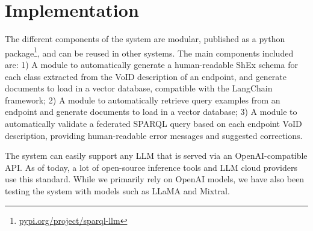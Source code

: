 \documentclass[
]{ceurart}
\begin{document}
\section{Implementation}

The different components of the system are modular, published as a python package\footnote{\href{https://pypi.org/project/sparql-llm}{pypi.org/project/sparql-llm}}, and can be reused in other systems. The main components included are: 1) A module to automatically generate a human-readable ShEx schema for each class extracted from the VoID description of an endpoint, and generate documents to load in a vector database, compatible with the LangChain framework; 2) A module to automatically retrieve query examples from an endpoint and generate documents to load in a vector database; 3) A module to automatically validate a federated SPARQL query based on each endpoint VoID description, providing human-readable error messages and suggested corrections.



The system can easily support any LLM that is served via an OpenAI-compatible API. As of today, a lot of open-source inference tools and LLM cloud providers use this standard. While we primarily rely on OpenAI models, we have also been testing the system with models such as LLaMA and Mixtral.
\end{document}

